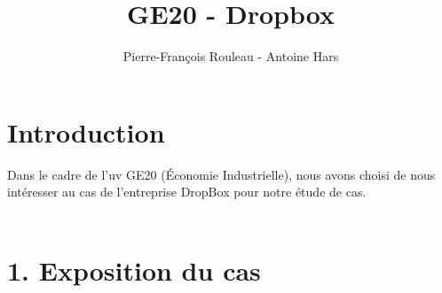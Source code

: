 \documentclass[a4paper, 10pt]{article}
\title{GE20 - Dropbox}
\author{Pierre-François Rouleau - Antoine Hars}
\begin{document}
\maketitle

\section*{Introduction}
Dans le cadre de l'uv GE20 (Économie Industrielle),
nous avons choisi de nous intéresser au cas de l'entreprise DropBox pour notre étude de cas.\\ \\

\section*{1. Exposition du cas}
\end{document}
